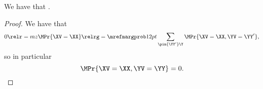 \begin{proposition}
  \nrp
  We have that \margzimplprop.%
\end{proposition}

\begin{proof}
  \nrp
  We have that
  $$0 \relr = mz \MPr{\XV = \XX} \relrg = {\mrefmargprob} 12pt \sum_{\pin{\YY'}\Y} \MPr{\XV = \XX, \YV = \YY'},$$%
  \nrp
  so in particular 
  $$\MPr{\XV = \XX, \YV = \YY} = 0.$$%
\end{proof}
